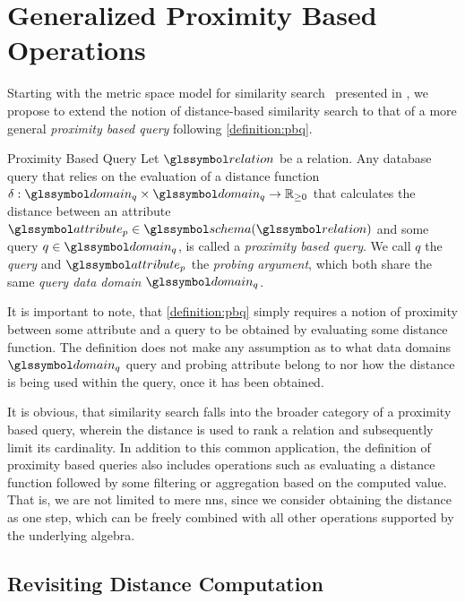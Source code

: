 \section{Generalized Proximity Based Operations}

Starting with the metric space model for similarity search~\cite{Zezula:2006Similarity} presented in , we propose to extend the notion of distance-based similarity search to that of a more general \emph{proximity based query} following \cref{definition:pbq}.

\begin{definition}[label=definition:pbq]{Proximity Based Query}{}
    Let $\relation$ be a relation. Any database query that relies on the evaluation of a distance function $\delta: \domain_q \times \domain_q \rightarrow \mathbb{R}_{\geq 0}$ that calculates the distance between an attribute $\attribute_{p} \in \schema(\relation)$ and some query $q \in \domain_q$, is called a \emph{proximity based query}. We call $q$ the \emph{query} and $\attribute_{p}$ the \emph{probing argument}, which both share the same \emph{query data domain} $\domain_q$.
\end{definition}

It is important to note, that \cref{definition:pbq} simply requires a notion of proximity between some attribute and a query to be obtained by evaluating some distance function. The definition does not make any assumption as to what data domains $\domain_q$ query and probing attribute belong to nor how the distance is being used within the query, once it has been obtained. 

It is obvious, that similarity search falls into the broader category of a proximity based query, wherein the distance is used to rank a relation and subsequently limit its cardinality. In addition to this common application, the definition of proximity based queries also includes operations such as evaluating a distance function followed by some filtering or aggregation based on the computed value. That is, we are not limited to mere \acrshort{nns}, since we consider obtaining the distance as one step, which can be freely combined with all other operations supported by the underlying algebra.

\subsection{Revisiting Distance Computation}

